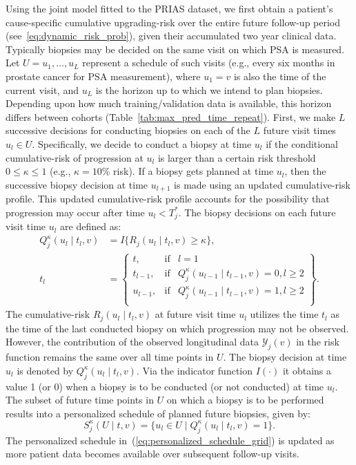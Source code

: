 Using the joint model fitted to the PRIAS dataset, we first obtain a patient's cause-specific cumulative upgrading-risk over the entire future follow-up period (see~\ref{eq:dynamic_risk_prob}), given their accumulated two year clinical data. Typically biopsies may be decided on the same visit on which PSA is measured. Let $U={u_1, \ldots, u_L}$ represent a schedule of such visits (e.g., every six months in prostate cancer for PSA measurement), where $u_1=v$ is also the time of the current visit, and $u_L$ is the horizon up to which we intend to plan biopsies. Depending upon how much training/validation data is available, this horizon differs between cohorts (Table~\ref{tab:max_pred_time_repeat}). First, we make $L$ successive decisions for conducting biopsies on each of the $L$ future visit times $u_l \in U$. Specifically, we decide to conduct a biopsy at time $u_l$ if the conditional cumulative-risk of progression at $u_l$ is larger than a certain risk threshold $0 \leq \kappa \leq 1$ (e.g., $\kappa=10$\% risk). If a biopsy gets planned at time $u_l$, then the successive biopsy decision at time $u_{l+1}$ is made using an updated cumulative-risk profile. This updated cumulative-risk profile accounts for the possibility that progression may occur after time $u_l < T^*_j$. The biopsy decisions on each future visit time $u_l$ are defined as: 
\begin{equation*}
\label{eq:personalized_decision_grid}
\begin{split}
Q_j^{\kappa}(u_l \mid t_l, v) &= I\big\{R_j(u_l \mid t_l, v) \geq \kappa \big\},\\
t_l &= \left\{\begin{array}{lcr}
  t, &\mbox{if}& l=1\\
  t_{l-1}, &\mbox{if}&  Q_j^{\kappa}(u_{l-1} \mid t_{l-1}, v)=0, l\geq 2\\ 
  u_{l-1}, &\mbox{if}&  Q_j^{\kappa}(u_{l-1} \mid t_{l-1}, v)=1, l\geq 2\\
\end{array} \right\}.
\end{split}
\end{equation*}
The cumulative-risk $R_j(u_l \mid t_l, v)$ at future visit time $u_l$ utilizes the time $t_l$ as the time of the last conducted biopsy on which progression may not be observed. However, the contribution of the observed longitudinal data $\mathcal{Y}_{j}(v)$ in the risk function remains the same over all time points in $U$. The biopsy decision at time $u_l$ is denoted by ${Q_j^{\kappa}(u_l \mid t_l, v)}$. Via the indicator function $I(\cdot)$ it obtains a value 1 (or 0) when a biopsy is to be conducted (or not conducted) at time $u_l$. The subset of future time points in $U$ on which a biopsy is to be performed results into a personalized schedule of planned future biopsies, given by:
\begin{equation}
\label{eq:personalized_schedule_grid}
S_j^{\kappa}(U \mid t, v) = \big\{ u_l \in U \mid Q_j^{\kappa}(u_l \mid t_l, v)=1\big\}.
\end{equation}
The personalized schedule in~(\ref{eq:personalized_schedule_grid}) is updated as more patient data becomes available over subsequent follow-up visits.

